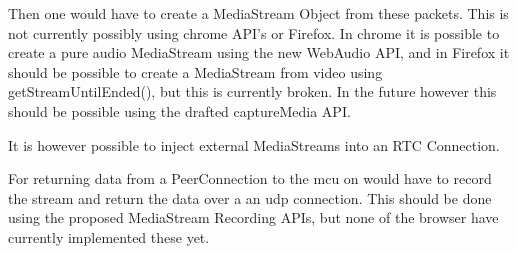 Then one would have to create a MediaStream Object from these packets. This is not currently possibly using chrome API's or Firefox. In chrome it is possible to create a pure audio MediaStream using the new WebAudio API, and in Firefox it should be possible to create a MediaStream from video using getStreamUntilEnded(), but this is currently broken. In the future however this should be possible using the drafted captureMedia API.

It is however possible to inject external MediaStreams into an RTC Connection.

For returning data from a PeerConnection to the \gls{mcu} on would have to record the stream and return the data over a an \gls{udp} connection. This should be done using the proposed MediaStream Recording APIs, but none of the browser have currently implemented these yet.